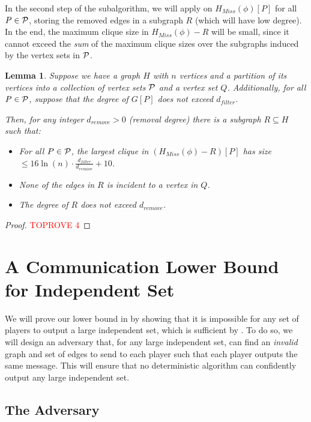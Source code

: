\documentclass[11pt]{article}
\newtheorem{lemma}{Lemma}[section]
\theoremstyle{definition}
\renewcommand{\leq}{\leqslant}
\renewcommand{\le}{\leq}
\begin{document}
In the second step of the subalgorithm, we will apply  on $H_{Miss}(\phi)[P]$ for all $P\in \mathcal{P}$, storing the removed edges in a subgraph $R$ (which will have low degree). In the end, the maximum clique size in $H_{Miss}(\phi)-R$ will be small, since it cannot exceed the \textit{sum} of the maximum clique sizes over the subgraphs induced by the vertex sets in $\mathcal{P}$.

\begin{lemma}\label{algo-second-step}
Suppose we have a graph $H$ with $n$ vertices and a partition of its vertices into a collection of vertex sets $\mathcal{P}$ and a vertex set $Q$. Additionally, for all $P\in \mathcal{P}$, suppose that the degree of $G[P]$ does not exceed $d_{filter}$.

Then, for any integer $d_{remove}>0$ (removal degree) there is a subgraph $R\subseteq H$ such that: 
\begin{itemize}
\item For all $P\in \mathcal{P}$, the largest clique in $(H_{Miss}(\phi)-R)[P]$ has size $\le 16\ln(n)\cdot \frac{d_{filter}}{d_{remove}}+10$. 
\item None of the edges in $R$ is incident to a vertex in $Q$. 
\item The degree of $R$ does not exceed $d_{remove}$. 
\end{itemize}
\end{lemma}
\begin{proof}\textcolor{red}{TOPROVE 4}\end{proof}

\section{A Communication Lower Bound for Independent Set}

We will prove our lower bound in  by showing that it is impossible for any set of players to output a large independent set, which is sufficient by . To do so, we will design an adversary that, for any large independent set, can find an \textit{invalid} graph and set of edges to send to each player such that each player outputs the same message. This will ensure that no deterministic algorithm can confidently output any large independent set. 

\subsection{The Adversary}
\end{document}
